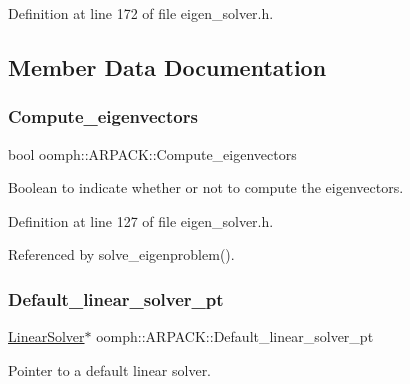 Definition at line 172 of file eigen\+\_\+solver.\+h.



\subsection{Member Data Documentation}
\mbox{\label{classoomph_1_1ARPACK_af8a6dba4dca423fd67488e34970886df}} 
\subsubsection{\texorpdfstring{Compute\+\_\+eigenvectors}{Compute\_eigenvectors}}
{\footnotesize\ttfamily bool oomph\+::\+A\+R\+P\+A\+C\+K\+::\+Compute\+\_\+eigenvectors\hspace{0.3cm}{\ttfamily [private]}}



Boolean to indicate whether or not to compute the eigenvectors. 



Definition at line 127 of file eigen\+\_\+solver.\+h.



Referenced by solve\+\_\+eigenproblem().

\mbox{\label{classoomph_1_1ARPACK_ad6d487dfc1f84d8008e52fc87d83c644}} 
\subsubsection{\texorpdfstring{Default\+\_\+linear\+\_\+solver\+\_\+pt}{Default\_linear\_solver\_pt}}
{\footnotesize\ttfamily \hyperlink{classoomph_1_1LinearSolver}{Linear\+Solver}$\ast$ oomph\+::\+A\+R\+P\+A\+C\+K\+::\+Default\+\_\+linear\+\_\+solver\+\_\+pt\hspace{0.3cm}{\ttfamily [private]}}



Pointer to a default linear solver. 



